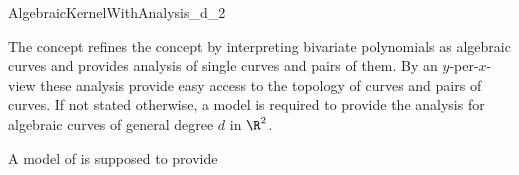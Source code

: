\begin{ccRefConcept}{AlgebraicKernelWithAnalysis_d_2} 

\ccDefinition

The  concept refines
the  concept by interpreting bivariate polynomials
as algebraic curves and provides analysis of single curves and pairs of them.
By an $y$-per-$x$-view 
these analysis provide easy access to the topology of curves and pairs of
curves. If not stated otherwise, a model is required to 
provide the analysis for algebraic curves of general degree $d$ in $\R^2$.

\ccRefines
{}

\ccTypes

A model of  is supposed to provide

\ccGlue
{}

\ccHasModels


\ccSeeAlso



\end{ccRefConcept}
